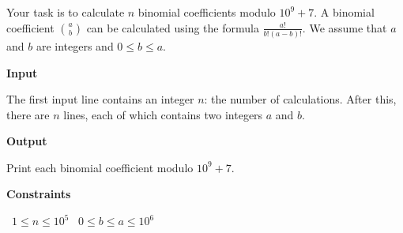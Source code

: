 Your task is to calculate $n$ binomial coefficients modulo $10^9+7$.
A binomial coefficient ${a \choose b}$ can be calculated using the formula $\frac{a!}{b!(a-b)!}$. We assume that $a$ and $b$ are integers and $0 \le b \le a$.

\vspace{0.3cm}\noindent\textbf{Input}

The first input line contains an integer $n$: the number of calculations.
After this, there are $n$ lines, each of which contains two integers $a$ and $b$.

\vspace{0.3cm}\noindent\textbf{Output}

Print each binomial coefficient modulo $10^9+7$.

\vspace{0.3cm}\noindent\textbf{Constraints}

\textbullet\ $1 \le n \le 10^5$
\textbullet\ $0 \le b \le a \le 10^6$